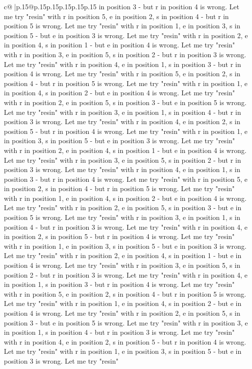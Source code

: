 \documentclass{article}
\begin{document}
{\begin{supertabular}{c@{$\;$}|p{.15\linewidth}@{}p{.15\linewidth}p{.15\linewidth}p{.15\linewidth}p{.15\linewidth}p{.15\linewidth}}
{{{in position 3 {-} but r in position 4 is wrong. Let me try "resin" with r in position 5, e in position 2, s in position 4 {-} but r in position 5 is wrong. Let me try "resin" with r in position 1, e in position 3, s in position 5 {-} but e in position 3 is wrong. Let me try "resin" with r in position 2, e in position 4, s in position 1 {-} but e in position 4 is wrong. Let me try "resin" with r in position 3, e in position 5, s in position 2 {-} but r in position 3 is wrong. Let me try "resin" with r in position 4, e in position 1, s in position 3 {-} but r in position 4 is wrong. Let me try "resin" with r in position 5, e in position 2, s in position 4 {-} but r in position 5 is wrong. Let me try "resin" with r in position 1, e in position 4, s in position 2 {-} but e in position 4 is wrong. Let me try "resin" with r in position 2, e in position 5, s in position 3 {-} but e in position 5 is wrong. Let me try "resin" with r in position 3, e in position 1, s in position 4 {-} but r in position 3 is wrong. Let me try "resin" with r in position 4, e in position 2, s in position 5 {-} but r in position 4 is wrong. Let me try "resin" with r in position 1, e in position 3, s in position 5 {-} but e in position 3 is wrong. Let me try "resin" with r in position 2, e in position 4, s in position 1 {-} but e in position 4 is wrong. Let me try "resin" with r in position 3, e in position 5, s in position 2 {-} but r in position 3 is wrong. Let me try "resin" with r in position 4, e in position 1, s in position 3 {-} but r in position 4 is wrong. Let me try "resin" with r in position 5, e in position 2, s in position 4 {-} but r in position 5 is wrong. Let me try "resin" with r in position 1, e in position 4, s in position 2 {-} but e in position 4 is wrong. Let me try "resin" with r in position 2, e in position 5, s in position 3 {-} but e in position 5 is wrong. Let me try "resin" with r in position 3, e in position 1, s in position 4 {-} but r in position 3 is wrong. Let me try "resin" with r in position 4, e in position 2, s in position 5 {-} but r in position 4 is wrong. Let me try "resin" with r in position 1, e in position 3, s in position 5 {-} but e in position 3 is wrong. Let me try "resin" with r in position 2, e in position 4, s in position 1 {-} but e in position 4 is wrong. Let me try "resin" with r in position 3, e in position 5, s in position 2 {-} but r in position 3 is wrong. Let me try "resin" with r in position 4, e in position 1, s in position 3 {-} but r in position 4 is wrong. Let me try "resin" with r in position 5, e in position 2, s in position 4 {-} but r in position 5 is wrong. Let me try "resin" with r in position 1, e in position 4, s in position 2 {-} but e in position 4 is wrong. Let me try "resin" with r in position 2, e in position 5, s in position 3 {-} but e in position 5 is wrong. Let me try "resin" with r in position 3, e in position 1, s in position 4 {-} but r in position 3 is wrong. Let me try "resin" with r in position 4, e in position 2, s in position 5 {-} but r in position 4 is wrong. Let me try "resin" with r in position 1, e in position 3, s in position 5 {-} but e in position 3 is wrong. Let me try "resin" }}}
\end{supertabular}}
\end{document}
